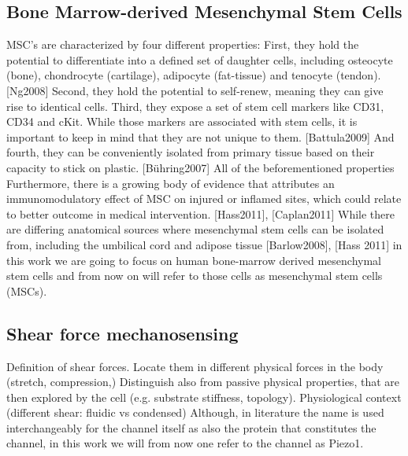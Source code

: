 \subsection{Bone Marrow-derived Mesenchymal Stem Cells}
MSC's are characterized by four different properties: First, they hold the potential to differentiate into a defined set of daughter cells, including osteocyte (bone), chondrocyte (cartilage), adipocyte (fat-tissue) and tenocyte (tendon).[Ng2008] Second, they hold the potential to self-renew, meaning they can give rise to identical cells. Third, they expose a set of stem cell markers like CD31, CD34 and cKit. While those markers are associated with stem cells, it is important to keep in mind that they are not unique to them. [Battula2009] And fourth, they can be conveniently isolated from primary tissue based on their capacity to stick on plastic. [Bühring2007] All of the beforementioned properties Furthermore, there is a growing body of evidence that attributes an immunomodulatory effect of MSC on injured or inflamed sites, which could relate to better outcome in medical intervention. [Hass2011], [Caplan2011]
While there are differing anatomical sources where mesenchymal stem cells can be isolated from, including the umbilical cord and adipose tissue [Barlow2008], [Hass 2011] in this work we are going to focus on human bone-marrow derived mesenchymal stem cells and from now on will refer to those cells as mesenchymal stem cells (MSCs).


\subsection{Shear force mechanosensing}
Definition of shear forces. Locate them in different physical forces in the body (stretch, compression,) Distinguish also from passive physical properties, that are then explored by the cell (e.g. substrate stiffness, topology).
Physiological context (different shear: fluidic vs condensed)
Although, in literature the name \Piezo{} is used interchangeably for the channel itself as also the protein that constitutes the channel, in this work we will from now one refer to the channel as Piezo1.


